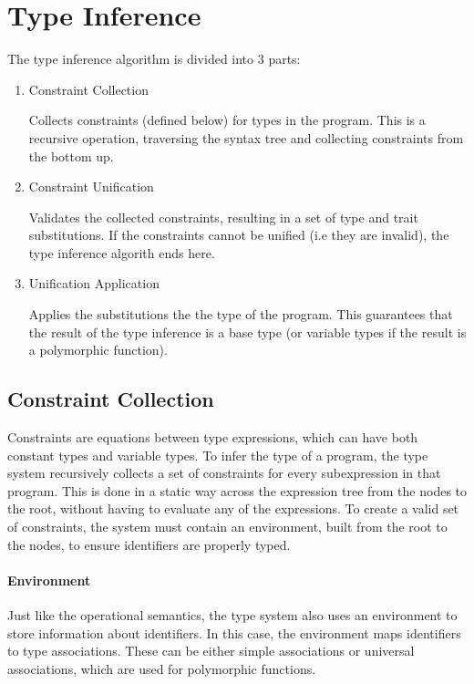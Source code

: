 \documentclass{article}
\begin{document}
\section{Type Inference}

The type inference algorithm is divided into 3 parts:

\begin{enumerate}
  \item Constraint Collection

    Collects constraints (defined below) for types in the program.
    This is a recursive operation, traversing the syntax tree and collecting constraints from the bottom up.

  \item Constraint Unification

    Validates the collected constraints, resulting in a set of type and trait substitutions.
    If the constraints cannot be unified (i.e they are invalid), the type inference algorith ends here.

  \item Unification Application

    Applies the substitutions the the type of the program.
    This guarantees that the result of the type inference is a base type (or variable types if the result is a polymorphic function).
\end{enumerate}

\subsection{Constraint Collection}

Constraints are equations between type expressions, which can have both constant types and variable types.
To infer the type of a program, the type system recursively collects a set of constraints for every subexpression in that program.
This is done in a static way across the expression tree from the nodes to the root, without having to evaluate any of the expressions.
To create a valid set of constraints, the system must contain an environment, built from the root to the nodes, to ensure identifiers are properly typed.

\paragraph{Environment}
Just like the operational semantics, the type system also uses an environment to store information about identifiers.
In this case, the environment maps identifiers to type associations.
These can be either simple associations or universal associations, which are used for polymorphic functions.
\end{document}
